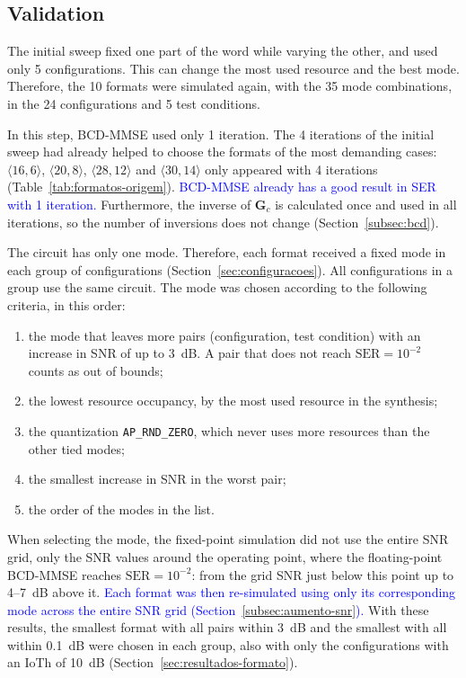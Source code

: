 \subsection{\texorpdfstring{Validation}{Validation}}\label{subsec:validacao}
The initial sweep fixed one part of the word while varying the other, and used only 5 configurations. This can change the most used resource and the best mode. Therefore, the 10 formats were simulated again, with the 35 mode combinations, in the 24 configurations and 5 test conditions.

In this step, BCD-MMSE used only 1 iteration. The 4 iterations of the initial sweep had already helped to choose the formats of the most demanding cases: $\langle 16,6\rangle$, $\langle 20,8\rangle$, $\langle 28,12\rangle$ and $\langle 30,14\rangle$ only appeared with 4 iterations (Table~\ref{tab:formatos-origem}). \textcolor{blue}{BCD-MMSE already has a good result in SER with 1 iteration.} Furthermore, the inverse of $\mathbf G_c$ is calculated once and used in all iterations, so the number of inversions does not change (Section~\ref{subsec:bcd}).

The circuit has only one mode. Therefore, each format received a fixed mode in each group of configurations (Section~\ref{sec:configuracoes}). All configurations in a group use the same circuit. The mode was chosen according to the following criteria, in this order:

\begin{enumerate}

\item the mode that leaves more pairs (configuration, test condition) with an increase in SNR of up to 3~dB. A pair that does not reach $\mathrm{SER} = 10^{-2}$ counts as out of bounds;
\item the lowest resource occupancy, by the most used resource in the synthesis;
\item  the quantization \texttt{AP\_RND\_ZERO}, which never uses more resources than the other tied modes;

\item the smallest increase in SNR in the worst pair;
\item the order of the modes in the list.

\end{enumerate}

When selecting the mode, the fixed-point simulation did not use the entire SNR grid, only the SNR values around the operating point, where the floating-point BCD-MMSE reaches $\mathrm{SER} = 10^{-2}$: from the grid SNR just below this point up to 4--7~dB above it. \textcolor{blue}{Each format was then re-simulated using only its corresponding mode across the entire SNR grid (Section~\ref{subsec:aumento-snr}).} With these results, the smallest format with all pairs within 3~dB and the smallest with all within 0.1~dB were chosen in each group, also with only the configurations with an IoTh of 10~dB (Section~\ref{sec:resultados-formato}).